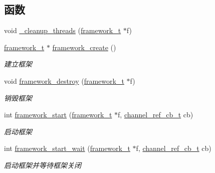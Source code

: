 \subsection*{函数}
\begin{DoxyCompactItemize}
\item 
void \hyperlink{a00048_a4f0e9b4ae9c3310e14e109d04f2978f5_a4f0e9b4ae9c3310e14e109d04f2978f5}{\+\_\+cleanup\+\_\+threads} (\hyperlink{a00047_a6149d769f6f07ed14a40a271c95d8463_a6149d769f6f07ed14a40a271c95d8463}{framework\+\_\+t} $\ast$f)
\item 
\hyperlink{a00047_a6149d769f6f07ed14a40a271c95d8463_a6149d769f6f07ed14a40a271c95d8463}{framework\+\_\+t} $\ast$ \hyperlink{a00093_ga90b29a0c500209cb9b37437a32188a40_ga90b29a0c500209cb9b37437a32188a40}{framework\+\_\+create} ()
\begin{DoxyCompactList}\small\item\em 建立框架 \end{DoxyCompactList}\item 
void \hyperlink{a00093_gad1b6cb17014bfc515f8861bad3198e22_gad1b6cb17014bfc515f8861bad3198e22}{framework\+\_\+destroy} (\hyperlink{a00047_a6149d769f6f07ed14a40a271c95d8463_a6149d769f6f07ed14a40a271c95d8463}{framework\+\_\+t} $\ast$f)
\begin{DoxyCompactList}\small\item\em 销毁框架 \end{DoxyCompactList}\item 
int \hyperlink{a00093_ga7579f69fe8d0ec6887e4594f52cbb883_ga7579f69fe8d0ec6887e4594f52cbb883}{framework\+\_\+start} (\hyperlink{a00047_a6149d769f6f07ed14a40a271c95d8463_a6149d769f6f07ed14a40a271c95d8463}{framework\+\_\+t} $\ast$f, \hyperlink{a00047_ae296ec4d1ce108960de8dcc423956a1d_ae296ec4d1ce108960de8dcc423956a1d}{channel\+\_\+ref\+\_\+cb\+\_\+t} cb)
\begin{DoxyCompactList}\small\item\em 启动框架 \end{DoxyCompactList}\item 
int \hyperlink{a00093_gadd2b49ff4ff090a4490bd0128d00efba_gadd2b49ff4ff090a4490bd0128d00efba}{framework\+\_\+start\+\_\+wait} (\hyperlink{a00047_a6149d769f6f07ed14a40a271c95d8463_a6149d769f6f07ed14a40a271c95d8463}{framework\+\_\+t} $\ast$f, \hyperlink{a00047_ae296ec4d1ce108960de8dcc423956a1d_ae296ec4d1ce108960de8dcc423956a1d}{channel\+\_\+ref\+\_\+cb\+\_\+t} cb)
\begin{DoxyCompactList}\small\item\em 启动框架并等待框架关闭 \end{DoxyCompactList}\item 

\end{DoxyCompactItemize}
